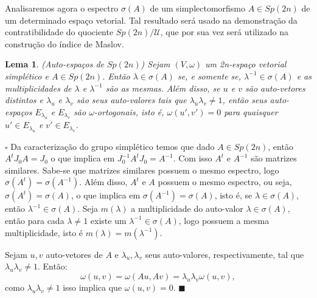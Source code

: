 \documentclass[12pt]{book}
\newtheorem{lema}[teorema]{Lema}
\newenvironment{prova}[1]{$\square$ #1}{\hfill$\blacksquare$}
\newcommand{\espectrooperador}[1]{\sigma(#1)}
\newcommand{\estruturacomplexa}{J_{0}}
\newcommand{\gruposimpletico}[1]{Sp(#1)}
\newcommand{\matrizSimpleticaOrtogonal}{\mathcal{U}}
\begin{document}
	Analisaremos agora o espectro $\espectrooperador{A}$ de um simplectomorfismo $A \in \gruposimpletico{2n}$ de um determinado espaço vetorial. Tal resultado será usado na demonstração da contratibilidade do quociente $\gruposimpletico{2n}/\matrizSimpleticaOrtogonal$, que por sua vez será utilizado na construção do índice de Maslov.
	
	\begin{lema}\label{lema_auto_espaco_grupo_simpletico}
		(Auto-espaços de $\gruposimpletico{2n}$) Sejam $(V, \omega)$ um 2n-espaço vetorial simplético e $A \in \gruposimpletico{2n}$. Então $\lambda \in \espectrooperador{A}$ se, e somente se, $\lambda^{-1} \in \espectrooperador{A}$ e as multiplicidades de $\lambda$ e $\lambda^{-1}$ são as mesmas. Além disso, se $u$ e $v$ são auto-vetores distintos e $\lambda_{u}$ e $\lambda_{v}$ são seus auto-valores tais que $\lambda_{u}\lambda_{v} \neq 1$, então seus auto-espaços $E_{\lambda_{u}}$ e $E_{\lambda_{v}}$ são $\omega$-ortogonais, isto é, $\omega(u',v') = 0$ para quaisquer $u' \in E_{\lambda_{u}}$ e $v' \in E_{\lambda_{v}}$. 
	\end{lema}
	\begin{prova}
		Da caracterização do grupo simplético temos que dado $A \in \gruposimpletico{2n}$, então $A^{t}\estruturacomplexa A = \estruturacomplexa$ o que implica em $\estruturacomplexa^{-1}A^{t}\estruturacomplexa = A^{-1}$. Com isso $A^{t}$ e $A^{-1}$ são matrizes similares. Sabe-se que matrizes similares possuem o mesmo espectro, logo $\espectrooperador{A^{t}}=\espectrooperador{A^{-1}}$. Além disso, $A^{t}$ e $A$ possuem o mesmo espectro, ou seja, $\espectrooperador{A^{t}} = \espectrooperador{A}$, o que implica em $\espectrooperador{A^{-1}} = \espectrooperador{A}$, isto é, se $\lambda \in \espectrooperador{A}$, então $\lambda^{-1} \in \espectrooperador{A}$. Seja $m(\lambda)$ a multiplicidade do auto-valor $\lambda \in \espectrooperador{A}$, então para cada $\lambda \neq 1$ existe um $\lambda^{-1} \in \espectrooperador{A}$, logo possuem a mesma multiplicidade, isto é $m(\lambda) = m(\lambda^{-1})$.
		
		Sejam $u, v$ auto-vetores de $A$ e $\lambda_{u}, \lambda_{v}$ seus auto-valores, respectivamente, tal que $\lambda_{u}\lambda_{v}\neq 1$. Então:
		$$
		\omega(u,v)=\omega(Au,Av) = \lambda_{u}\lambda_{v}\omega(u,v), 
		$$
		como $\lambda_{u}\lambda_{v}\neq 1$ isso implica que $\omega(u,v)=0$.
	\end{prova}
	
\end{document}
